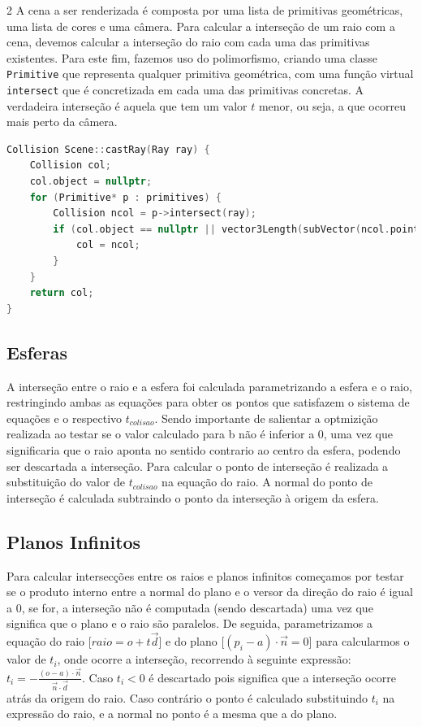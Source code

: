 \documentclass{article}
\begin{document}
\begin{multicols}{2}
    A cena a ser renderizada é composta por uma lista de primitivas geométricas,
    uma lista de cores e uma câmera. Para calcular a interseção de um raio com a cena,
    devemos calcular a interseção do raio com cada uma das primitivas existentes. Para este
    fim, fazemos uso do polimorfismo, criando uma classe \verb|Primitive| que representa
    qualquer primitiva geométrica, com uma função virtual \verb|intersect| que é concretizada
    em cada uma das primitivas concretas. A verdadeira interseção é aquela que tem um valor $t$
    menor, ou seja, a que ocorreu mais perto da câmera.

\begin{lstlisting}[language=C++]
Collision Scene::castRay(Ray ray) {
	Collision col;
	col.object = nullptr;
	for (Primitive* p : primitives) {
		Collision ncol = p->intersect(ray);
		if (col.object == nullptr || vector3Length(subVector(ncol.point, camera->GetFrom())) < vector3Length(subVector(col.point, camera->GetFrom()))) {
			col = ncol;
		}
	}
	return col;
}
\end{lstlisting}

    \subsection{Esferas}
    A interseção entre o raio e a esfera foi calculada  parametrizando a esfera e o raio, restringindo ambas as  equações para obter os pontos que satisfazem o sistema de equações e o respectivo $ t_{colisao}$. 
    Sendo importante de salientar a optmizição realizada ao testar se o valor calculado para b não é inferior a 0, uma vez que significaria que o raio aponta no sentido contrario ao centro da esfera, podendo ser descartada a interseção.   
    Para calcular o ponto de interseção é realizada a substituição do valor de $ t_{colisao}$ na equação do raio.
    A normal do ponto de interseção é calculada subtraindo o ponto da interseção à origem da esfera.

    \subsection{Planos Infinitos}
    Para calcular intersecções entre os raios e planos infinitos começamos por testar se o produto interno entre a normal do plano e o versor da direção do raio é igual a 0, se for, a interseção não é computada (sendo descartada) uma vez que significa que o plano e o raio são paralelos. De seguida, parametrizamos a equação do raio [$raio = o + t\vec{d} $] e do plano [$ (p_i - a) \cdot \vec{n} = 0$] para calcularmos o valor de  $ t_i$, onde ocorre a interseção, recorrendo à seguinte expressão:  $ t_i = -\frac{(o - a)\cdot \vec{n}}{\vec{n} \cdot \vec{d}}$. Caso $t_i < 0$ é descartado pois significa que a interseção ocorre atrás da origem do raio. Caso contrário o ponto é calculado substituindo $ t_i$ na expressão do raio, e a normal no ponto é a mesma que a do plano.
   

\end{multicols}
\end{document}
